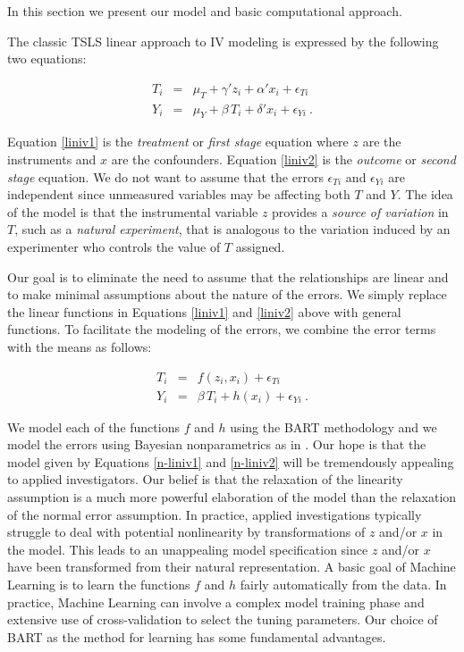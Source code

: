 
In this section we present our model and basic computational approach.

The classic TSLS linear approach to IV modeling is expressed by 
the following two equations:

\begin{eqnarray}\label{liniv}
T_i & = & \mu_T + \gamma' z_i + \alpha' x_i + \epsilon_{Ti} \label{liniv1} \\
Y_i & = & \mu_Y + \beta \, T_i + \delta' x_i +
          \epsilon_{Yi} \label{liniv2}\ .
\end{eqnarray}

Equation \ref{liniv1} is the {\it treatment} or {\it first stage} equation
where $z$ are the instruments and $x$ are the confounders.
Equation \ref{liniv2} is the {\it outcome} or {\it second stage} equation.
We do not want to assume that the errors $\epsilon_{Ti}$ and $\epsilon_{Yi}$ are independent
since unmeasured variables may be affecting both $T$ and $Y$.
The idea of the model is that the instrumental variable $z$ provides a
{\it source of variation} in $T$, such as a {\it natural experiment}, that
is analogous to the variation induced by an experimenter who
controls the value of $T$ assigned.

Our goal is to eliminate the need to assume that the relationships are
linear and to make minimal assumptions about the nature of the errors.
We simply replace the linear functions in Equations \ref{liniv1} and
\ref{liniv2} above with general functions.  To facilitate the modeling
of the errors, we combine the error terms with the means as follows:

\begin{eqnarray}\label{nliniv}
T_i & = & f(z_i,x_i) + \epsilon_{Ti} \label{n-liniv1} \\
Y_i & = & \beta \, T_i + h(x_i) + \epsilon_{Yi}\ . \label{n-liniv2}
\end{eqnarray}

We model each of the functions $f$ and $h$ using the BART methodology and we model the errors using
Bayesian nonparametrics as in \cite{CHMR08}.
Our hope is that the model given by Equations
\ref{n-liniv1} and \ref{n-liniv2} will be tremendously appealing to
applied investigators.  Our belief is that the relaxation of the linearity
assumption is a much more powerful elaboration of the model than the
relaxation of the normal error assumption.  In practice, applied
investigations typically struggle to deal with potential nonlinearity by
transformations of $z$ and/or $x$ in the model.  This leads to an
unappealing model specification since $z$ and/or $x$ have been
transformed from their natural representation.  A basic goal of
Machine Learning is to learn the functions $f$ and $h$ fairly
automatically from the data.  In practice, Machine Learning can
involve a complex model training phase and extensive use of
cross-validation to select the tuning parameters.  Our choice of BART
as the method for learning has some fundamental advantages. 

